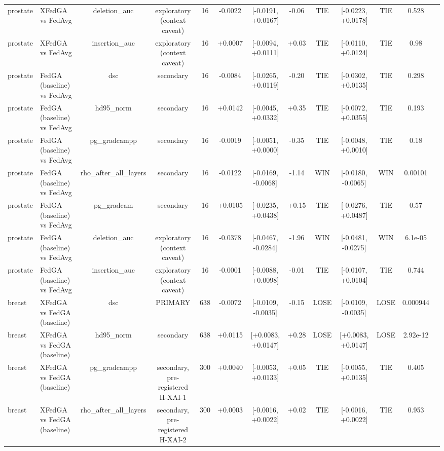 \begin{tabular}{llccccccccccc}
prostate & XFedGA vs FedAvg & deletion\_auc & exploratory (context caveat) & 16 & -0.0022 & [-0.0191, +0.0167] & -0.06 & TIE & [-0.0223, +0.0178] & TIE & 0.528 &  \\
prostate & XFedGA vs FedAvg & insertion\_auc & exploratory (context caveat) & 16 & +0.0007 & [-0.0094, +0.0111] & +0.03 & TIE & [-0.0110, +0.0124] & TIE & 0.98 &  \\
prostate & FedGA (baseline) vs FedAvg & dsc & secondary & 16 & -0.0084 & [-0.0265, +0.0119] & -0.20 & TIE & [-0.0302, +0.0135] & TIE & 0.298 &  \\
prostate & FedGA (baseline) vs FedAvg & hd95\_norm & secondary & 16 & +0.0142 & [-0.0045, +0.0332] & +0.35 & TIE & [-0.0072, +0.0355] & TIE & 0.193 &  \\
prostate & FedGA (baseline) vs FedAvg & pg\_gradcampp & secondary & 16 & -0.0019 & [-0.0051, +0.0000] & -0.35 & TIE & [-0.0048, +0.0010] & TIE & 0.18 &  \\
prostate & FedGA (baseline) vs FedAvg & rho\_after\_all\_layers & secondary & 16 & -0.0122 & [-0.0169, -0.0068] & -1.14 & WIN & [-0.0180, -0.0065] & WIN & 0.00101 &  \\
prostate & FedGA (baseline) vs FedAvg & pg\_gradcam & secondary & 16 & +0.0105 & [-0.0235, +0.0438] & +0.15 & TIE & [-0.0276, +0.0487] & TIE & 0.57 &  \\
prostate & FedGA (baseline) vs FedAvg & deletion\_auc & exploratory (context caveat) & 16 & -0.0378 & [-0.0467, -0.0284] & -1.96 & WIN & [-0.0481, -0.0275] & WIN & 6.1e-05 &  \\
prostate & FedGA (baseline) vs FedAvg & insertion\_auc & exploratory (context caveat) & 16 & -0.0001 & [-0.0088, +0.0098] & -0.01 & TIE & [-0.0107, +0.0104] & TIE & 0.744 &  \\
breast & XFedGA vs FedGA (baseline) & dsc & PRIMARY & 638 & -0.0072 & [-0.0109, -0.0035] & -0.15 & LOSE & [-0.0109, -0.0035] & LOSE & 0.000944 &  \\
breast & XFedGA vs FedGA (baseline) & hd95\_norm & secondary & 638 & +0.0115 & [+0.0083, +0.0147] & +0.28 & LOSE & [+0.0083, +0.0147] & LOSE & 2.92e-12 &  \\
breast & XFedGA vs FedGA (baseline) & pg\_gradcampp & secondary, pre-registered H-XAI-1 & 300 & +0.0040 & [-0.0053, +0.0133] & +0.05 & TIE & [-0.0055, +0.0135] & TIE & 0.405 &  \\
breast & XFedGA vs FedGA (baseline) & rho\_after\_all\_layers & secondary, pre-registered H-XAI-2 & 300 & +0.0003 & [-0.0016, +0.0022] & +0.02 & TIE & [-0.0016, +0.0022] & TIE & 0.953 &  \\

\end{tabular}
